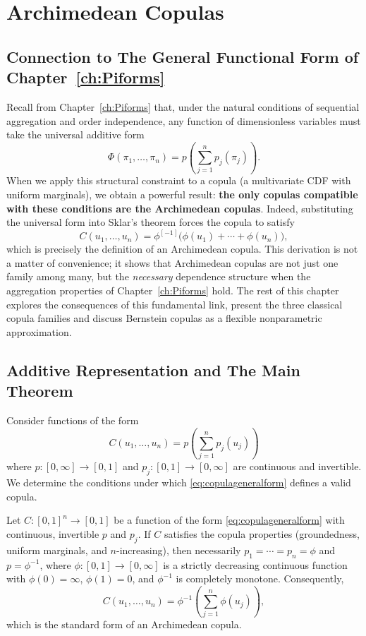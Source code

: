 \startcontents[chapter]
\chapter{Archimedean Copulas}
\label{ch:ArchimedeanCopulas}
\minitocboxed

\section*{Connection to The General Functional Form of Chapter~\ref{ch:Piforms}}
Recall from Chapter~\ref{ch:Piforms} that, under the natural conditions of sequential aggregation and order independence, any function of dimensionless variables must take the universal additive form
\[
\Phi(\pi_1,\dots,\pi_n) = p\!\left(\sum_{j=1}^n p_j(\pi_j)\right).
\]
When we apply this structural constraint to a copula (a multivariate CDF with uniform marginals), we obtain a powerful result: \textbf{the only copulas compatible with these conditions are the Archimedean copulas}. Indeed, substituting the universal form into Sklar’s theorem forces the copula to satisfy
\[
C(u_1,\dots,u_n) = \phi^{[-1]}\!\bigl(\phi(u_1)+\cdots+\phi(u_n)\bigr),
\]
which is precisely the definition of an Archimedean copula. This derivation is not a matter of convenience; it shows that Archimedean copulas are not just one family among many, but the \emph{necessary} dependence structure when the aggregation properties of Chapter~\ref{ch:Piforms} hold. The rest of this chapter explores the consequences of this fundamental link, present the three classical copula families and discuss Bernstein copulas as a flexible nonparametric approximation.

\section{Additive Representation and The Main Theorem}

Consider functions of the form
\begin{equation}
C(u_1,\ldots,u_n)=p\!\left(\sum_{j=1}^n p_j(u_j)\right) \label{eq:copulageneralform}
\end{equation}
where \(p:[0,\infty]\rightarrow[0,1]\) and \(p_j:[0,1]\rightarrow[0,\infty]\) are continuous and invertible. We determine the conditions under which \eqref{eq:copulageneralform} defines a valid copula.

\begin{theorem}
Let \(C:[0,1]^n\to[0,1]\) be a function of the form \eqref{eq:copulageneralform} with continuous, invertible \(p\) and \(p_j\). If \(C\) satisfies the copula properties (groundedness, uniform marginals, and \(n\)-increasing), then necessarily \(p_1=\cdots=p_n=\phi\) and \(p=\phi^{-1}\), where \(\phi:[0,1]\to[0,\infty]\) is a strictly decreasing continuous function with \(\phi(0)=\infty\), \(\phi(1)=0\), and \(\phi^{-1}\) is completely monotone. Consequently,
\begin{equation}
C(u_1,\ldots,u_n)=\phi^{-1}\!\left(\sum_{j=1}^n\phi(u_j)\right), \label{eq:archimedean}
\end{equation}
which is the standard form of an Archimedean copula.
\end{theorem}

